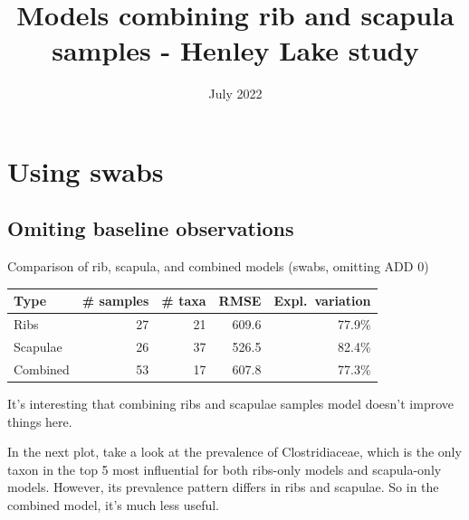 \documentclass{beamer}
\title[]{Models combining rib and scapula samples - Henley Lake study}
\date{July 2022}
\begin{document}
\begin{frame}
   \titlepage
\end{frame}












\section{Using swabs}


\subsection{Omiting baseline observations}

\begin{frame}{Comparison of rib, scapula, and combined models (swabs, omitting ADD 0)}

  \begin{tabular}{lrrrr}
    Type & \# samples & \# taxa & RMSE & Expl.\ variation\\ \hline
    Ribs & 27 & 21 & 609.6 & 77.9\% \\
    Scapulae & 26 & 37 & 526.5 & 82.4\% \\
    Combined & 53 & 17 & 607.8 & 77.3\%
  \end{tabular}

  \vspace{0.2in}

  \footnotesize{
    \noindent It's interesting that combining ribs and scapulae samples model
    doesn't improve things here.\\

    \vspace{0.2in}
    
    In the next plot, take a look at the prevalence of Clostridiaceae, which is
    the only taxon in the top 5 most influential for both ribs-only models and
    scapula-only models.  However, its prevalence pattern differs in ribs and
    scapulae.  So in the combined model, it's much less useful.

    }

\end{frame}
\end{document}
